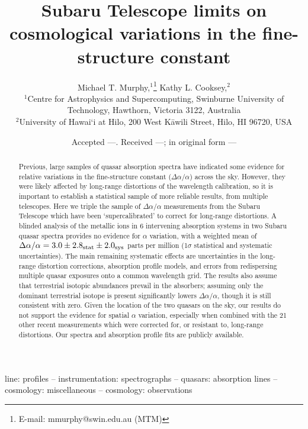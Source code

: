 \documentclass[fleqn,usenatbib,usedcolumn]{mnras}
\title[Subaru limits on varying $\alpha$]{Subaru Telescope limits on cosmological variations in the fine-structure constant}
\author[M. T. Murphy, K. L. Cooksey]{Michael T. Murphy,$^{1}$\thanks{E-mail: mmurphy@swin.edu.au (MTM)} Kathy L. Cooksey,$^{2}$\\
  $^{1}$Centre for Astrophysics and Supercomputing, Swinburne University of Technology, Hawthorn, Victoria 3122, Australia\\
  $^{2}$University of Hawai`i at Hilo, 200 West K\={a}wili Street, Hilo, HI 96720, USA
}
\date{Accepted ---. Received ---; in original form ---}
\begin{document}
\label{firstpage}
\pagerange{\pageref{firstpage}--\pageref{lastpage}}
\maketitle

\begin{abstract}
Previous, large samples of quasar absorption spectra have indicated some evidence for relative variations in the fine-structure constant ($\Delta\alpha/\alpha$) across the sky. However, they were likely affected by long-range distortions of the wavelength calibration, so it is important to establish a statistical sample of more reliable results, from multiple telescopes. Here we triple the sample of $\Delta\alpha/\alpha$ measurements from the Subaru Telescope which have been `supercalibrated' to correct for long-range distortions. A blinded analysis of the metallic ions in 6 intervening absorption systems in two Subaru quasar spectra provides no evidence for $\alpha$ variation, with a weighted mean of $\Delta\alpha/\alpha=3.0\pm2.8_{\rm stat}\pm2.0_{\rm sys}$ parts per million (1$\sigma$ statistical and systematic uncertainties). The main remaining systematic effects are uncertainties in the long-range distortion corrections, absorption profile models, and errors from redispersing multiple quasar exposures onto a common wavelength grid. The results also assume that terrestrial isotopic abundances prevail in the absorbers; assuming only the dominant terrestrial isotope is present significantly lowers $\Delta\alpha/\alpha$, though it is still consistent with zero. Given the location of the two quasars on the sky, our results do not support the evidence for spatial $\alpha$ variation, especially when combined with the 21 other recent measurements which were corrected for, or resistant to, long-range distortions. Our spectra and absorption profile fits are publicly available.
\end{abstract}

\begin{keywords}
line: profiles -- instrumentation: spectrographs -- quasars: absorption lines -- cosmology: miscellaneous -- cosmology: observations
\end{keywords}

\end{document}
